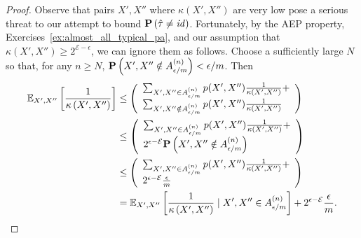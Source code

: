 \begin{proof}
Observe that pairs $X', X''$ where $\kappa\left(X', X''\right)$ are very low pose a serious threat to our attempt to bound $\mathbf{P}\left(\hat{\tau} \neq \mathit{id}\right)$. Fortunately, by the AEP property, Exercises~\ref{ex:almost_all_typical_pa}, and our assumption that $\kappa(X', X'') \geq 2^{\mathcal{E} - \epsilon}$, we can ignore them as follows. Choose a sufficiently large $N$ so that, for any $n \geq N$, $\mathbf{P}\left(X', X'' \notin A^{(n)}_{\epsilon/m}\right) < \epsilon / m$. Then
%
\begin{align}
\mathbb{E}_{X', X''}\left[\frac{1}{\kappa\left(X', X''\right)}\right]
&\leq \left(
\begin{array}{l}
\sum_{X', X'' \in A^{(n)}_{\epsilon/m}}p(X', X'')\frac{1}{\kappa\left(X', X''\right)} +\\ 
\sum_{X', X'' \notin A^{(n)}_{\epsilon/m}}p(X', X'')\frac{1}{\kappa\left(X', X''\right)}
\end{array}\right)\\
&\leq \left(
\begin{array}{l}
\sum_{X', X'' \in A^{(n)}_{\epsilon/m}}p(X', X'')\frac{1}{\kappa\left(X', X''\right)} +\\ 
2^{\epsilon - \mathcal{E}}\mathbf{P}\left(X', X'' \notin A^{(n)}_{\epsilon/m}\right)
\end{array}\right)\\
&\leq \left(
\begin{array}{l}
\sum_{X', X'' \in A^{(n)}_{\epsilon/m}}p(X', X'')\frac{1}{\kappa\left(X', X''\right)} +\\ 
2^{\epsilon - \mathcal{E}}\frac{\epsilon}{m}
\end{array}\right)\\
&= \mathbb{E}_{X', X''}\left[\frac{1}{\kappa\left(X', X''\right)} \mid X', X'' \in A^{(n)}_{\epsilon/m}\right] + 2^{\epsilon - \mathcal{E}}\frac{\epsilon}{m}.
\end{align}


\end{proof}
